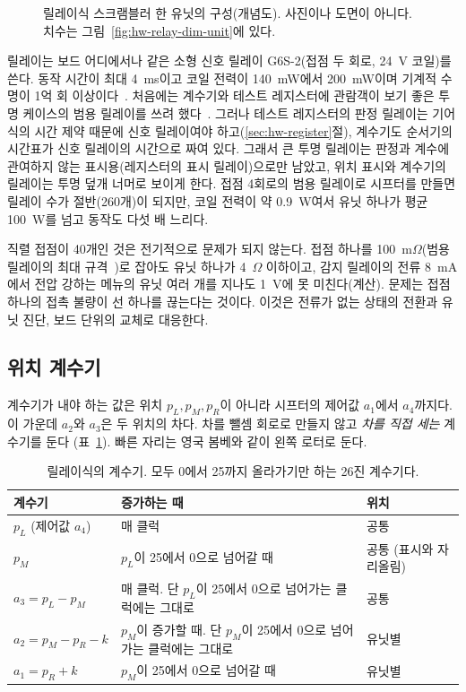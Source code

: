 \begin{figure}[ht]
\centering

\caption{릴레이식 스크램블러 한 유닛의 구성(개념도). 사진이나 도면이 아니다. 치수는
그림~\ref{fig:hw-relay-dim-unit}에 있다.}
\label{fig:hw-relay-view}
\end{figure}

릴레이는 보드 어디에서나 같은 소형 신호 릴레이 G6S-2(접점 두 회로, 24~V 코일)를 쓴다. 동작 시간이 최대 4~ms이고
코일 전력이 140~mW에서 200~mW이며 기계적 수명이 1억 회 이상이다~\cite{omron-g6s}. 처음에는 계수기와 테스트
레지스터에 관람객이 보기 좋은 투명 케이스의 범용 릴레이를 쓰려 했다~\cite{omron-my4}. 그러나 테스트 레지스터의
판정 릴레이는 기어식의 시간 제약 때문에 신호 릴레이여야 하고(\ref{sec:hw-register}절), 계수기도 순서기의 시간표가
신호 릴레이의 시간으로 짜여 있다. 그래서 큰 투명 릴레이는 판정과 계수에 관여하지 않는 표시용(레지스터의 표시
릴레이)으로만 남았고, 위치 표시와 계수기의 릴레이는 투명 덮개 너머로 보이게 한다. 접점 4회로의
범용 릴레이로 시프터를 만들면 릴레이 수가 절반(260개)이 되지만, 코일 전력이 약 0.9~W여서 유닛 하나가 평균
100~W를 넘고 동작도 다섯 배 느리다.

직렬 접점이 40개인 것은 전기적으로 문제가 되지 않는다. 접점 하나를 100~m$\Omega$(범용 릴레이의 최대
규격~\cite{omron-my4})로 잡아도 유닛 하나가 4~$\Omega$ 이하이고, 감지 릴레이의 전류 8~mA에서 전압 강하는
메뉴의 유닛 여러 개를 지나도 1~V에 못 미친다(계산). 문제는 접점 하나의 접촉 불량이 선 하나를 끊는다는
것이다. 이것은 전류가 없는 상태의 전환과 유닛 진단, 보드 단위의 교체로 대응한다.

\subsection{위치 계수기}\label{sec:hw-relay-counter}

계수기가 내야 하는 값은 위치 $p_L, p_M, p_R$이 아니라 시프터의 제어값 $a_1$에서 $a_4$까지다. 이 가운데
$a_2$와 $a_3$은 두 위치의 차다. 차를 뺄셈 회로로 만들지 않고 \emph{차를 직접 세는} 계수기를 둔다
(표~\ref{tab:hw-counters}). 빠른 자리는 영국 봄베와 같이 왼쪽 로터로 둔다.

\begin{table}[ht]
\centering
\caption{릴레이식의 계수기. 모두 0에서 25까지 올라가기만 하는 26진 계수기다.}
\label{tab:hw-counters}
\small
\begin{tabularx}{\linewidth}{l>{\raggedright\arraybackslash}X l}
\toprule
계수기 & 증가하는 때 & 위치 \\
\midrule
$p_L$ (제어값 $a_4$) & 매 클럭 & 공통 \\
$p_M$ & $p_L$이 25에서 0으로 넘어갈 때 & 공통 (표시와 자리올림) \\
$a_3 = p_L - p_M$ & 매 클럭. 단 $p_L$이 25에서 0으로 넘어가는 클럭에는 그대로 & 공통 \\
$a_2 = p_M - p_R - k$ & $p_M$이 증가할 때. 단 $p_M$이 25에서 0으로 넘어가는 클럭에는 그대로 & 유닛별 \\
$a_1 = p_R + k$ & $p_M$이 25에서 0으로 넘어갈 때 & 유닛별 \\
\bottomrule
\end{tabularx}
\end{table}


